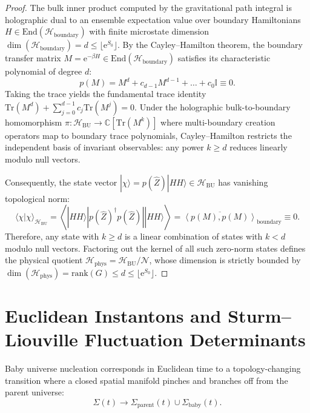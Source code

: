 \documentclass[11pt,a4paper,reqno]{article}
\theoremstyle{plain}
\theoremstyle{definition}
\theoremstyle{remark}
\numberwithin{equation}{section}
\newcommand{\Hbu}{\mathcal{H}_{\mathrm{BU}}}
\newcommand{\Hphys}{\mathcal{H}_{\mathrm{phys}}}
\newcommand{\HH}{|HH\rangle}
\newcommand{\Zop}{\widehat{Z}}
\newcommand{\Tr}{\mathrm{Tr}}
\begin{document}
\begin{proof}
The bulk inner product computed by the gravitational path integral is holographic dual to an ensemble expectation value over boundary Hamiltonians $H \in \mathrm{End}(\mathcal{H}_{\mathrm{boundary}})$ with finite microstate dimension $\dim(\mathcal{H}_{\mathrm{boundary}}) = d \le \lfloor \mathrm{e}^{S_0} \rfloor$. By the Cayley--Hamilton theorem, the boundary transfer matrix $M = \mathrm{e}^{-\beta H} \in \mathrm{End}(\mathcal{H}_{\mathrm{boundary}})$ satisfies its characteristic polynomial of degree $d$:
\begin{equation}
  p(M) = M^d + c_{d-1} M^{d-1} + \dots + c_0 \mathbb{I} \equiv 0.
\end{equation}
Taking the trace yields the fundamental trace identity $\Tr(M^d) + \sum_{j=0}^{d-1} c_j \Tr(M^j) = 0$. Under the holographic bulk-to-boundary homomorphism $\pi: \Hbu \to \mathbb{C}[\Tr(M^k)]$ where multi-boundary creation operators map to boundary trace polynomials, Cayley--Hamilton restricts the independent basis of invariant observables: any power $k \ge d$ reduces linearly modulo null vectors.

Consequently, the state vector $|\chi\rangle = p(\Zop) \HH \in \Hbu$ has vanishing topological norm:
\begin{equation}
  \langle \chi | \chi \rangle_{\Hbu} = \left\langle \HH \left| p(\Zop)^\dagger p(\Zop) \right| \HH \right\rangle = \overline{\left\langle p(M), p(M) \right\rangle}_{\mathrm{boundary}} \equiv 0.
\end{equation}
Therefore, any state with $k \ge d$ is a linear combination of states with $k < d$ modulo null vectors. Factoring out the kernel of all such zero-norm states defines the physical quotient $\Hphys = \Hbu / \mathcal{N}$, whose dimension is strictly bounded by $\dim(\Hphys) = \mathrm{rank}(G) \le d \le \lfloor \mathrm{e}^{S_0} \rfloor$.
\end{proof}

\section{Euclidean Instantons and Sturm--Liouville Fluctuation Determinants}
\label{sec:instantons}

Baby universe nucleation corresponds in Euclidean time to a topology-changing transition where a closed spatial manifold pinches and branches off from the parent universe:
\begin{equation}
  \Sigma(t) \longrightarrow \Sigma_{\mathrm{parent}}(t) \cup \Sigma_{\mathrm{baby}}(t).
\end{equation}
\end{document}
